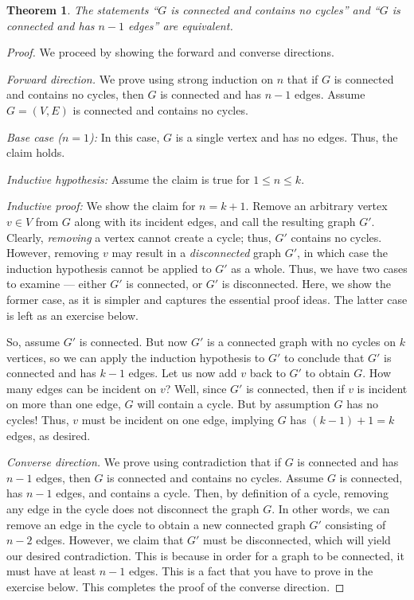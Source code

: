 \documentclass[11pt]{article}
\newcounter{thm}
\newtheorem{theorem}{Theorem}[thm]
\begin{document}
\begin{theorem}\label{thm:equiv}
    The statements ``$G$ is connected and contains no cycles'' and ``$G$ is connected and has $n-1$ edges'' are equivalent.
\end{theorem}
\begin{proof}
    We proceed by showing the forward and converse directions.
    
    \emph{Forward direction.} We prove using strong induction on $n$ that if $G$ is connected and contains no cycles, then $G$ is connected and has $n-1$ edges. Assume $G=(V,E)$ is connected and contains no cycles.

    \emph{Base case ($n=1$):} In this case, $G$ is a single vertex and has no edges. Thus, the claim holds.

    \emph{Inductive hypothesis:} Assume the claim is true for $1\leq n\leq k$.

    \emph{Inductive proof:} We show the claim for $n=k+1$. Remove an arbitrary vertex $v\in V$ from $G$ along with its incident edges, and call the resulting graph $G'$. Clearly, \emph{removing} a vertex cannot create a cycle; thus, $G'$ contains no cycles. However, removing $v$ may result in a \emph{disconnected} graph $G'$, in which case the induction hypothesis cannot be applied to $G'$ as a whole. Thus, we have two cases to examine --- either $G'$ is connected, or $G'$ is disconnected. Here, we show the former case, as it is simpler and captures the essential proof ideas. The latter case is left as an exercise below.

    So, assume $G'$ is connected. But now $G'$ is a connected graph with no cycles on $k$ vertices, so we can apply the induction hypothesis to $G'$ to conclude that $G'$ is connected and has $k-1$ edges. Let us now add $v$ back to $G'$ to obtain $G$. How many edges can be incident on $v$? Well, since $G'$ is connected, then if $v$ is incident on more than one edge, $G$ will contain a cycle. But by assumption $G$ has no cycles! Thus, $v$ must be incident on one edge, implying $G$ has $(k-1) + 1 = k$ edges, as desired.
    
    \emph{Converse direction.} We prove using contradiction that if $G$ is connected and has $n-1$ edges, then $G$ is connected and contains no cycles. Assume $G$ is connected, has $n-1$ edges, and contains a cycle. Then, by definition of a cycle, removing any edge in the cycle does not disconnect the graph $G$. In other words, we can remove an edge in the cycle to obtain a new connected graph $G'$ consisting of $n-2$ edges. However, we claim that $G'$ must be disconnected, which will yield our desired contradiction. 
This is because in order for a graph to be connected, it must have at least $n-1$ edges. This is a fact that you have to prove in the exercise below.
This completes the proof of the converse direction.
\end{proof}
\end{document}
